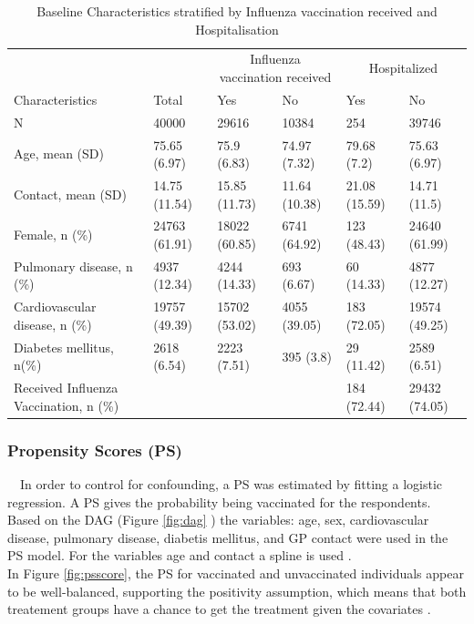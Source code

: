 \documentclass[
]{article}
\begin{document}
\begin{table}[!h]

\caption{\label{tab:des}Baseline Characteristics stratified by Influenza vaccination received and Hospitalisation}
\centering
\begin{tabular}[t]{llllll}
\toprule
\multicolumn{1}{c}{ } & \multicolumn{1}{c}{ } & \multicolumn{2}{c}{Influenza vaccination received} & \multicolumn{2}{c}{Hospitalized} \\
\cmidrule(l{3pt}r{3pt}){3-4} \cmidrule(l{3pt}r{3pt}){5-6}
Characteristics & Total & Yes & No & Yes & No\\
\midrule
N & 40000 & 29616 & 10384 & 254 & 39746\\
Age, mean (SD) & 75.65 (6.97) & 75.9 (6.83) & 74.97 (7.32) & 79.68 (7.2) & 75.63 (6.97)\\
Contact, mean (SD) & 14.75 (11.54) & 15.85 (11.73) & 11.64 (10.38) & 21.08 (15.59) & 14.71 (11.5)\\
Female, n (\%) & 24763 (61.91) & 18022 (60.85) & 6741 (64.92) & 123 (48.43) & 24640 (61.99)\\
Pulmonary disease, n (\%) & 4937 (12.34) & 4244 (14.33) & 693 (6.67) & 60 (14.33) & 4877 (12.27)\\
\addlinespace
Cardiovascular disease, n (\%) & 19757 (49.39) & 15702 (53.02) & 4055 (39.05) & 183 (72.05) & 19574 (49.25)\\
Diabetes mellitus, n(\%) & 2618 (6.54) & 2223 (7.51) & 395 (3.8) & 29 (11.42) & 2589 (6.51)\\
Received Influenza Vaccination, n (\%) &  &  &  & 184 (72.44) & 29432 (74.05)\\
\bottomrule
\end{tabular}
\end{table}

\hypertarget{propensity-scores-ps}{%
\subsubsection{Propensity Scores (PS)}\label{propensity-scores-ps}}

~~In order to control for confounding, a PS was estimated by fitting a logistic regression. A PS gives the probability being vaccinated for the respondents. Based on the DAG (Figure \ref{fig:dag} ) the variables: age, sex, cardiovascular disease, pulmonary disease, diabetis mellitus, and GP contact were used in the PS model. For the variables age and contact a spline is used \citep{Tian}.\\
\hspace*{0.333em}\hspace*{0.333em}\hspace*{0.333em}\hspace*{0.333em}In Figure \ref{fig:psscore}, the PS for vaccinated and unvaccinated individuals appear to be well-balanced, supporting the positivity assumption, which means that both treatement groups have a chance to get the treatment given the covariates \citep{westreich}.
\end{document}
